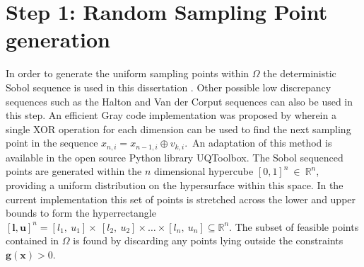 \section{Step 1: Random Sampling Point generation} \label{sec:tgo1}
In order to generate the uniform sampling points within $\Omega$ the deterministic Sobol sequence is used in this dissertation \cite{Henderson2015, Sobol1967}. Other possible low discrepancy sequences such as the Halton and Van der Corput sequences \cite{zbMATH03440485} can also be used in this step. An efficient Gray code implementation was proposed by \citet{Antonov1979} wherein a single XOR operation for each dimension can be used to find the next sampling point in the sequence $x_{n,i}=x_{n-1,i} \oplus v_{k,i}. \,$ An adaptation of this method is available in the open source Python library UQToolbox\cite{Bigoni2016}. The Sobol sequenced points are generated within the $n$ dimensional hypercube $ [0, 1]^n~\in ~\mathbb{R}^n $, providing a uniform distribution on the hypersurface within this space. In the current implementation this set of points is stretched across the lower and upper bounds to form the hyperrectangle $[\mathbf{l}, \mathbf{u}]^n = [l_1,~u_1] \times~[l_2,~u_2]  \times \dots \times [l_n,~u_n] \subseteq  \mathbb{R}^n$. The subset of feasible points contained in $\Omega$ is found by discarding any points lying outside the constraints $ \mathbf{g}(\mathbf{x}) > 0$.

